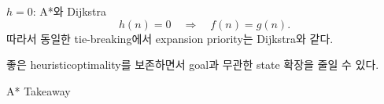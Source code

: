 \begin{frame}{\(h=0\): A*와 Dijkstra}
\[
h(n)=0\quad\Rightarrow\quad f(n)=g(n).
\]
따라서 동일한 tie-breaking에서 expansion priority는 Dijkstra와 같다.
\begin{block}{좋은 heuristic}optimality를 보존하면서 goal과 무관한 state 확장을 줄일 수 있다.\end{block}
\end{frame}
\begin{frame}{A* Takeaway}
\end{frame}
